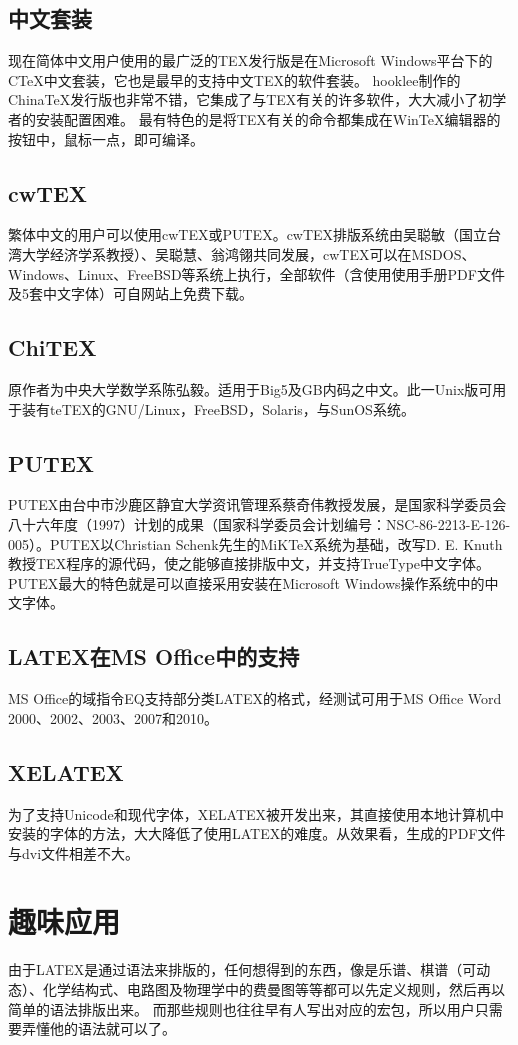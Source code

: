 \documentclass[12pt]{article}
\begin{document}
        \subsection{中文套装}
        现在简体中文用户使用的最广泛的TEX发行版是在Microsoft Windows平台下的CTeX中文套装，它也是最早的支持中文TEX的软件套装。
        hooklee制作的ChinaTeX发行版也非常不错，它集成了与TEX有关的许多软件，大大减小了初学者的安装配置困难。
        最有特色的是将TEX有关的命令都集成在WinTeX编辑器的按钮中，鼠标一点，即可编译。

        \subsection{cwTEX}
        繁体中文的用户可以使用cwTEX或PUTEX。cwTEX排版系统由吴聪敏（国立台湾大学经济学系教授）、吴聪慧、翁鸿翎共同发展，cwTEX可以在MSDOS、Windows、Linux、FreeBSD等系统上执行，全部软件（含使用使用手册PDF文件及5套中文字体）可自网站上免费下载。

        \subsection{ChiTEX}
        原作者为中央大学数学系陈弘毅。适用于Big5及GB内码之中文。此一Unix版可用于装有teTEX的GNU/Linux，FreeBSD，Solaris，与SunOS系统。

        \subsection{PUTEX}
        PUTEX由台中市沙鹿区静宜大学资讯管理系蔡奇伟教授发展，是国家科学委员会八十六年度（1997）计划的成果（国家科学委员会计划编号：NSC-86-2213-E-126-005）。PUTEX以Christian Schenk先生的MiKTeX系统为基础，改写D. E. Knuth教授TEX程序的源代码，使之能够直接排版中文，并支持TrueType中文字体。PUTEX最大的特色就是可以直接采用安装在Microsoft Windows操作系统中的中文字体。

        \subsection{LATEX在MS Office中的支持}
        MS Office的域指令EQ支持部分类LATEX的格式，经测试可用于MS Office Word 2000、2002、2003、2007和2010。

        \subsection{XELATEX}
        为了支持Unicode和现代字体，XELATEX被开发出来，其直接使用本地计算机中安装的字体的方法，大大降低了使用LATEX的难度。从效果看，生成的PDF文件与dvi文件相差不大。

    \section{趣味应用}
    由于LATEX是通过语法来排版的，任何想得到的东西，像是乐谱、棋谱（可动态）、化学结构式、电路图及物理学中的费曼图等等都可以先定义规则，然后再以简单的语法排版出来。
    而那些规则也往往早有人写出对应的宏包，所以用户只需要弄懂他的语法就可以了。

    
\end{document}
